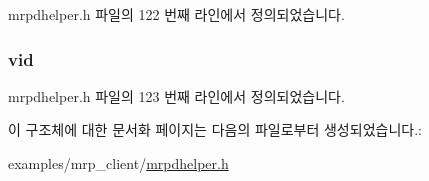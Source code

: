 mrpdhelper.\+h 파일의 122 번째 라인에서 정의되었습니다.

\subsubsection[{\texorpdfstring{vid}{vid}}]{ vid}\hypertarget{structmrpdhelper__msrp__domain_a98780fe4ab562a61abfd7870ea0910c3}{}\label{structmrpdhelper__msrp__domain_a98780fe4ab562a61abfd7870ea0910c3}


mrpdhelper.\+h 파일의 123 번째 라인에서 정의되었습니다.



이 구조체에 대한 문서화 페이지는 다음의 파일로부터 생성되었습니다.\+:\begin{DoxyCompactItemize}
\item 
examples/mrp\+\_\+client/\hyperlink{mrpdhelper_8h}{mrpdhelper.\+h}\end{DoxyCompactItemize}
